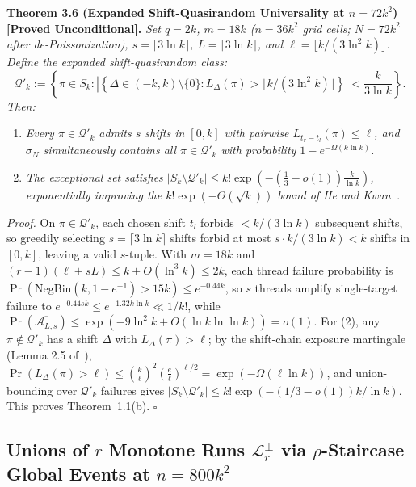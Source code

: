 \documentclass[
  11pt,
]{article}
\providecommand{\tightlist}{%
  \setlength{\itemsep}{0pt}\setlength{\parskip}{0pt}}
\begin{document}
\textbf{Theorem 3.6 (Expanded Shift-Quasirandom Universality at \(n = 72 k^2\)) [Proved Unconditional].}
\emph{Set \(q = 2k\), \(m = 18k\) (\(n = 36 k^2\) grid cells; \(N = 72 k^2\) after de-Poissonization), \(s = \lceil 3 \ln k \rceil\), \(L = \lceil 3 \ln k \rceil\), and \(\ell = \lfloor k / (3 \ln^2 k) \rfloor\). Define the expanded shift-quasirandom class:}
\begin{equation}
\mathcal{Q}'_k := \left\{ \pi \in S_k : \left| \left\{ \Delta \in (-k, k) \setminus \{0\} : L_\Delta(\pi) > \lfloor k / (3 \ln^2 k) \rfloor \right\} \right| < \frac{k}{3 \ln k} \right\}.
\end{equation}
\emph{Then:}
\begin{enumerate}
\def\labelenumi{\arabic{enumi}.}
\tightlist
\item \emph{Every \(\pi \in \mathcal{Q}'_k\) admits \(s\) shifts in \([0, k]\) with pairwise \(L_{t_r - t_l}(\pi) \le \ell\), and \(\sigma_N\) simultaneously contains all \(\pi \in \mathcal{Q}'_k\) with probability \(1 - e^{-\Omega(k \ln k)}\).}
\item \emph{The exceptional set satisfies \(|S_k \setminus \mathcal{Q}'_k| \le k! \exp\left(-(\frac{1}{3} - o(1))\frac{k}{\ln k}\right)\), exponentially improving the \(k! \exp(-\Theta(\sqrt{k}))\) bound of He and Kwan~\cite{ref-HK20}.}
\end{enumerate}

\emph{Proof.} On \(\pi \in \mathcal{Q}'_k\), each chosen shift \(t_l\) forbids \(< k/(3\ln k)\) subsequent shifts, so greedily selecting \(s = \lceil 3\ln k\rceil\) shifts forbid at most \(s \cdot k/(3\ln k) < k\) shifts in \([0, k]\), leaving a valid \(s\)-tuple. With \(m = 18k\) and \((r-1)(\ell + sL) \le k + O(\ln^3 k) \le 2k\), each thread failure probability is \(\Pr(\mathrm{NegBin}(k, 1-e^{-1}) > 15k) \le e^{-0.44 k}\), so \(s\) threads amplify single-target failure to \(e^{-0.44 s k} \le e^{-1.32 k \ln k} \ll 1/k!\), while \(\Pr(\overline{\mathcal{A}_{L, s}}) \le \exp(-9\ln^2 k + O(\ln k \ln\ln k)) = o(1)\). For (2), any \(\pi \notin \mathcal{Q}'_k\) has a shift \(\Delta\) with \(L_\Delta(\pi) > \ell\); by the shift-chain exposure martingale (Lemma 2.5 of~\cite{ref-HK20}), \(\Pr(L_\Delta(\pi) > \ell) \le \binom{k}{\ell}^2 (\frac{e}{\ell})^{\ell/2} = \exp(-\Omega(\ell \ln k))\), and union-bounding over \(\mathcal{Q}'_k\) failures gives \(|S_k \setminus \mathcal{Q}'_k| \le k! \exp(-(1/3 - o(1))k/\ln k)\). This proves Theorem~1.1(b). \(\square\)

\subsection{\texorpdfstring{Unions of \(r\) Monotone Runs \(\mathcal{L}^\pm_r\) via \(\rho\)-Staircase Global Events at \(n = 800 k^2\)}{Unions of r Monotone Runs \textbackslash mathcal\{L\}\^{}\textbackslash pm\_r via \textbackslash rho-Staircase Global Events at n = 800 k\^{}2}}\label{sec:w13-staircase}
\end{document}

